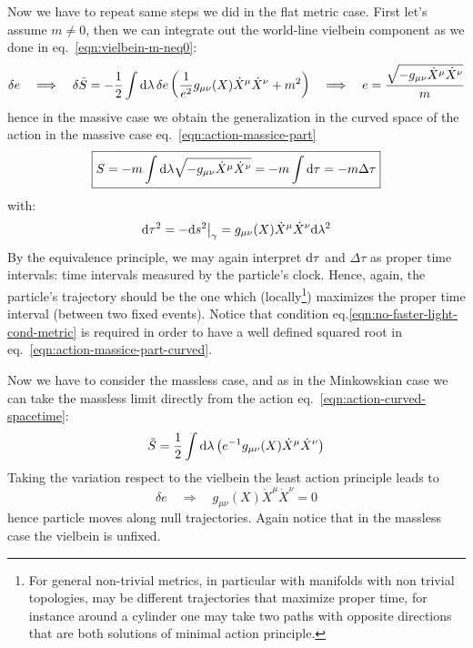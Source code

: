 \documentclass[../main/main.tex]{subfiles}
\begin{document}
Now we have to repeat same steps we did in the flat metric case. First let's assume $m\neq0$, then we can integrate out the world-line vielbein component as we done in eq.~\eqref{eqn:vielbein-m-neq0}:
\begin{equation}\label{eqn:vielbein-gen-m-neq0}
\delta e\quad\Longrightarrow\quad \delta \tilde S=-\frac12\int\textup{d}\lambda\,\delta e\left(\frac1{e^2}g_{\mu\nu}(X)\dot X^\mu\dot X^\nu+m^2\right)\quad\Longrightarrow\quad e=\frac{\sqrt{-g_{\mu\nu}\dot X^\mu\dot X^\nu}}m
\end{equation}
hence in the massive case we obtain the generalization in the curved space of the action in the massive case eq.~\eqref{eqn:action-massice-part}
\begin{equation}\label{eqn:action-massice-part-curved}
\boxed{
S=-m\int\textup{d}\lambda\sqrt{-g_{\mu\nu}\dot X^\mu\dot X^\nu}=-m\int\textup{d}\tau=-m\Delta\tau
}
\end{equation}
with:
\[\textup{d}\tau^2=-\textup{d} s^2\big\vert_\gamma=g_{\mu\nu}(X)\dot X^\mu\dot X^\nu\textup{d}\lambda^2\]
By the equivalence principle, we may again interpret $\textup{d}\tau$ and $\Delta\tau$ as proper time intervals: time intervals measured by the particle's clock. Hence, again, the particle's trajectory should be the one which (locally\footnote{For general non-trivial metrics, in particular with manifolds with non trivial topologies, may be different trajectories that maximize proper time, for instance around a cylinder one may take two paths with opposite directions that are both solutions of minimal action principle.}) maximizes the  proper time interval (between two fixed events). Notice that condition eq.\eqref{eqn:no-faster-light-cond-metric} is required in order to have a well defined squared root in eq.~\eqref{eqn:action-massice-part-curved}.

Now we have to consider the massless case, and as in the Minkowskian case we can take the massless limit directly from the action eq.~\eqref{eqn:action-curved-spacetime}:
\begin{equation}\label{eqn:action-curved-spacetime-massles}
\tilde S=\frac12\int\textup{d}\lambda\left(e^{-1}g_{\mu\nu}(X)\dot X^\mu\dot X^\nu\right)
\end{equation}
Taking the variation respect to the vielbein the least action principle leads to
\begin{equation}\label{eqn:action-massless-part-curved}
\delta e\quad\Longrightarrow\quad g_{\mu\nu}(X)\dot X^\mu\dot X^\nu=0
\end{equation}
hence particle moves along null trajectories. Again notice that in the massless case the vielbein is unfixed.  
\end{document}
